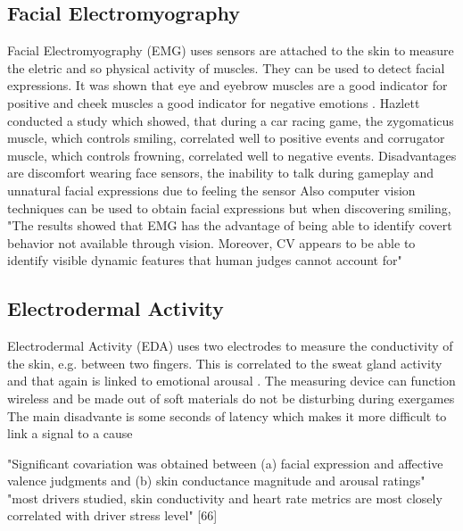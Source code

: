 \subsection{Facial Electromyography}
Facial Electromyography (EMG) uses sensors are attached to the skin to measure the eletric and so physical activity of muscles. They can be used to detect facial expressions. It was shown that eye \cite{ravaja2018phasic} and eyebrow muscles are a good indicator for positive and cheek muscles a good indicator for negative emotions \cite{nacke2015physiological,mandryk2006using}.
Hazlett conducted a study which showed, that during a car racing game, the zygomaticus muscle, which controls smiling, correlated well to positive events and corrugator muscle, which controls frowning, correlated well to negative events.
\cite{hazlett2006measuring}
Disadvantages are discomfort wearing face sensors, the inability to talk during gameplay and unnatural facial expressions due to feeling the sensor \cite{nacke2015physiological}
Also computer vision techniques can be used to obtain facial expressions but when discovering smiling, "The results showed that EMG has the advantage of
being able to identify covert behavior not available through
vision. Moreover, CV appears to be able to identify visible
dynamic features that human judges cannot account for" \cite{hernandez19invisible}

\subsection{Electrodermal Activity}
Electrodermal Activity (EDA) uses two electrodes to measure the conductivity of the skin, e.g. between two fingers. This is correlated to the sweat gland activity and that again is linked to emotional arousal \cite{nacke2015physiological, dawson2017electrodermal}. The measuring device can function wireless and be made out of soft materials \cite{kim2021soft} do not be disturbing during exergames 
The main disadvante is some seconds of latency which makes it more difficult to link a signal to a cause \cite{nacke2015physiological} 

"Significant covariation was obtained between (a) facial expression and affective valence judgments and (b) skin conductance magnitude and arousal ratings" \cite{lang93pictures}
"most drivers studied, skin conductivity and heart rate metrics are most closely correlated with driver stress level" [66]


